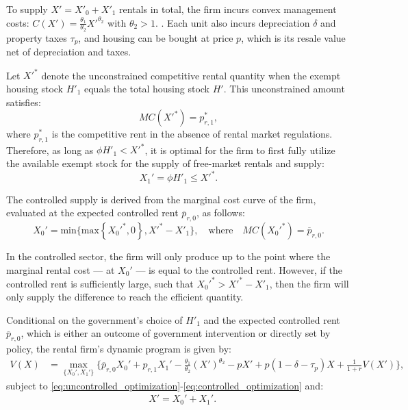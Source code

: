 \documentclass[parskip=full]{article}
\begin{document}
To supply $X'=X'_0+X'_1$ rentals in total, the firm incurs convex management costs: $C(X')=\frac{\theta_1}{\theta_2}X'^{\theta_2}$ with $\theta_2>1.$ \citep{garrigaeetal-2009}. Each unit also incurs depreciation $\delta$ and property taxes $\tau_p$, and housing can be bought at price $p$, which is its resale value net of depreciation and taxes.

Let $X'^{*}$ denote the unconstrained competitive rental quantity when the exempt housing stock $H'_1$ equals the total housing stock $H'$. This unconstrained amount satisfies: \[MC(X'^{*}) = p^{*}_{r,1},\] where $p^{*}_{r,1}$ is the competitive rent in the absence of rental market regulations. Therefore, as long as $\phi H'_1<X'^{*}$, it is optimal for the firm to first fully utilize the available exempt stock for the supply of free-market rentals and supply:
\begin{equation}\label{eq:uncontrolled_optimization}
X_1'=\phi H'_1\leq X'^{*}.  
\end{equation}

The controlled supply is derived from the marginal cost curve of the firm, evaluated at the expected controlled rent $\overline{p}_{r,0}$, as follows: 
\begin{equation}\label{eq:controlled_optimization}
X_0'=\mbox{min}\{\text{max}\left\{X_0'^*,0\right\},X'^*-X'_1\}, \quad
\text{where}\quad MC(X_0'^*)=\overline{p}_{r,0}.    
\end{equation}

\noindent In the controlled sector, the firm will only produce up to the point where the marginal rental cost — at $X_0'$ — is equal to the controlled rent. However, if the controlled rent is sufficiently large, such that $X_0'^*>X'^*-X'_1$, then the firm will only supply the difference to reach the efficient quantity.

Conditional on the government’s choice of $H'_1$ and the expected controlled rent $\overline{p}_{r,0}$, which is either an outcome of government intervention or directly set by policy, the rental firm’s dynamic program is given by:
\begin{align}\label{eq:rental_optimization}
V(X) &= \max_{\{X_0',X_1'\}} \Big\{\overline{p}_{r,0}X_0'+p_{r,1} X_1'-\frac{\theta_1}{\theta_2}(X')^{\theta_2}-p X'+p(1-\delta-\tau_p)X+\frac{1}{1+r} V(X')\Big\},
\end{align}
\noindent subject to \eqref{eq:uncontrolled_optimization}-\eqref{eq:controlled_optimization} and:
\begin{align}
& X'=X_0'+X_1'. \label{eq:total_supply_def}
\end{align}
\end{document}
